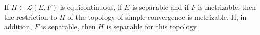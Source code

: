 If $H \subset \mathcal{L}(E, F)$ is equicontinuous, if $E$ is separable and if $F$ is metrizable, then the restriction to $H$ of the topology of simple convergence is metrizable. If, in addition, $F$ is separable, then $H$ is separable for this topology.
